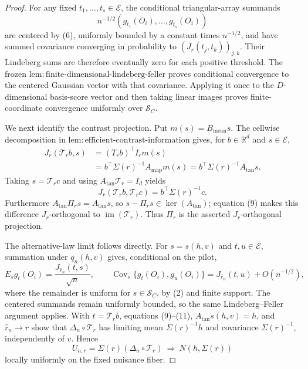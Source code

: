 \documentclass{article}
\begin{document}
\begin{proof}
For any fixed \(t_1,\ldots,t_s\in\mathcal E\), the conditional triangular-array summands
\[
 n^{-1/2}(g_{t_1}(O_i),\ldots,g_{t_s}(O_i))
\]
are centered by (6), uniformly bounded by a constant times \(n^{-1/2}\), and have summed covariance converging in probability to \((J_r(t_j,t_k))_{j,k}\).  Their Lindeberg sums are therefore eventually zero for each positive threshold.  The frozen \(\mathrm{lem:finite\text{-}dimensional\text{-}lindeberg\text{-}feller}\) proves conditional convergence to the centered Gaussian vector with that covariance.  Applying it once to the \(D\)-dimensional basis-score vector and then taking linear images proves finite-coordinate convergence uniformly over \(\mathcal S_C\).

We next identify the contrast projection.  Put \(m(s)=B_{\mathrm{mean}}s\).  The cellwise decomposition in \(\mathrm{lem:efficient\text{-}contrast\text{-}information}\) gives, for \(b\in\mathbb R^d\) and \(s\in\mathcal E\),
\[
 \begin{aligned}
 J_r(\mathcal T_rb,s)
 &=(T_rb)^\top I_rm(s)\\
 &=b^\top\Sigma(r)^{-1}A_{\mathrm{map}}m(s)
 =b^\top\Sigma(r)^{-1}A_{\mathrm{tan}}s.                            \tag{9}
 \end{aligned}
\]
Taking \(s=\mathcal T_rc\) and using \(A_{\mathrm{tan}}\mathcal T_r=I_d\) yields
\[
 J_r(\mathcal T_rb,\mathcal T_rc)=b^\top\Sigma(r)^{-1}c.             \tag{10}
\]
Furthermore \(A_{\mathrm{tan}}\Pi_rs=A_{\mathrm{tan}}s\), so \(s-\Pi_rs\in\ker(A_{\mathrm{tan}})\); equation (9) makes this difference \(J_r\)-orthogonal to \(\operatorname{im}(\mathcal T_r)\).  Thus \(\Pi_r\) is the asserted \(J_r\)-orthogonal projection.

The alternative-law limit follows directly.  For \(s=s(h,v)\) and \(t,u\in\mathcal E\), summation under \(q_n(h,v)\) gives, conditional on the pilot,
\[
 E_sg_t(O_i)=\frac{J_{\widehat r_n}(t,s)}{\sqrt n},\qquad
 \operatorname{Cov}_s\{g_t(O_i),g_u(O_i)\}
 =J_{\widehat r_n}(t,u)+O(n^{-1/2}),                                 \tag{11}
\]
where the remainder is uniform for \(s\in\mathcal S_C\), by (2) and finite support.  The centered summands remain uniformly bounded, so the same Lindeberg--Feller argument applies.  With \(t=\mathcal T_rb\), equations (9)--(11), \(A_{\mathrm{tan}}s(h,v)=h\), and \(\widehat r_n\to r\) show that \(\Delta_n\circ\mathcal T_r\) has limiting mean \(\Sigma(r)^{-1}h\) and covariance \(\Sigma(r)^{-1}\), independently of \(v\).  Hence
\[
 U_{n,r}=\Sigma(r)(\Delta_n\circ\mathcal T_r)
 \ \Rightarrow\ N(h,\Sigma(r))                                    \tag{12}
\]
locally uniformly on the fixed nuisance fiber.


\end{proof}
\end{document}
